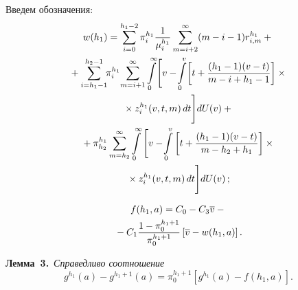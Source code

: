 \begin{multicols}{2}
  Введем обозначения:
  \begin{multline}
  w(h_1)= \sum\limits_{i=0}^{h_1-2} \pi_i^{h_1} \displaystyle\frac{\displaystyle 1\mathstrut}{\displaystyle \mu_i^{h_1}\mathstrut} 
\sum\limits^\infty_{m=i+2} (m-i-1) r^{h_1}_{i,m}+{}\\
  {}+ 
\sum\limits_{i=h_1-1}^{h_2-1} \!\!\pi_i^{h_1}\! \sum\limits^\infty_{m=i+1} \int\limits_0^\infty\! \Bigg[ v- \!
\int\limits_0^v \! \left[ t+ \displaystyle\frac{\displaystyle (h_1-1)(v-t)\mathstrut}{\displaystyle m-i+h_1-1\mathstrut}\right]\times{}\\
{}\times  z_i^{h_1}(v,t,m)\,dt\Bigg] dU(v)+{}\\
{}+
\pi^{h_1}_{h_2}\sum\limits^\infty_{m=h_2} \int\limits_0^\infty \Bigg[ v-\!\int\limits_0^v \left[ t+\displaystyle\frac{\displaystyle (h_1-
1)(v-t)\mathstrut}{\displaystyle m-h_2+h_1\mathstrut}\right] \times{}\\
{}\times z_i^{h_1}(v,t,m)\,dt\Bigg] dU(v)\,;
\label{e10-aga}
\end{multline}

\vspace*{-12pt}

\noindent
\begin{multline}
f(h_1,a) =C_0-C_3\overline{v} -{}\\
{}- C_1\displaystyle\frac{\displaystyle 1-\pi_0^{h_1+1}\mathstrut}{\displaystyle \pi_0^{h_1+1}\mathstrut}\left[ \overline{v} - w(h_1,a)\right].
\label{e11-aga}
\end{multline}

  \noindent
  \textbf{Лемма~3.}\ \textit{Справедливо соотношение}
  \begin{equation}
  g^{h_1}(a)- g^{h_1+1}(a) =\pi_0^{h_1+1} \left[ g^{h_1}(a)-f\left( 
h_1,a\right)\right].
  \label{e12-aga}
  \end{equation}


\end{multicols}
